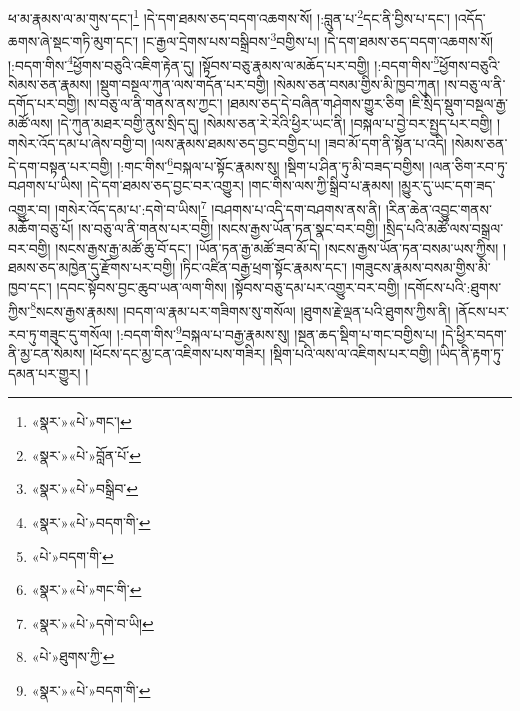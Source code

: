 ཕ་མ་རྣམས་ལ་མ་གུས་དང་།\footnote{«སྣར་»«པེ་»གང་།} །དེ་དག་ཐམས་ཅད་བདག་འཆགས་སོ། །:བླུན་པ་\footnote{«སྣར་»«པེ་»བློན་པོ་}དང་ནི་བྱིས་པ་དང་། །འདོད་ཆགས་ཞེ་སྡང་གཏི་མུག་དང་། །ང་རྒྱལ་དྲེགས་པས་བསྒྲིབས་\footnote{«སྣར་»«པེ་»བསྒྲིབ་}བགྱིས་པ། །དེ་དག་ཐམས་ཅད་བདག་འཆགས་སོ། །:བདག་གིས་\footnote{«སྣར་»«པེ་»བདག་གི་}ཕྱོགས་བཅུའི་འཇིག་རྟེན་དུ། །སྟོབས་བཅུ་རྣམས་ལ་མཆོད་པར་བགྱི། །:བདག་གིས་\footnote{«པེ་»བདག་གི་}ཕྱོགས་བཅུའི་སེམས་ཅན་རྣམས། །སྡུག་བསྔལ་ཀུན་ལས་གདོན་པར་བགྱི། །སེམས་ཅན་བསམ་གྱིས་མི་ཁྱབ་ཀུན། །ས་བཅུ་ལ་ནི་དགོད་པར་བགྱི། །ས་བཅུ་ལ་ནི་གནས་ནས་ཀྱང་། །ཐམས་ཅད་དེ་བཞིན་གཤེགས་གྱུར་ཅིག །ཇི་སྲིད་སྡུག་བསྔལ་རྒྱ་མཚོ་ལས། །དེ་ཀུན་མཐར་བགྱི་ནུས་སྲིད་དུ། །སེམས་ཅན་རེ་རེའི་ཕྱིར་ཡང་ནི། །བསྐལ་པ་བྱེ་བར་སྤྱད་པར་བགྱི། །གསེར་འོད་དམ་པ་ཞེས་བགྱི་བ། །ལས་རྣམས་ཐམས་ཅད་བྱང་བགྱིད་པ། །ཟབ་མོ་དག་ནི་སྟོན་པ་འདི། །སེམས་ཅན་དེ་དག་བསྟན་པར་བགྱི། །:གང་གིས་\footnote{«སྣར་»«པེ་»གང་གི་}བསྐལ་པ་སྟོང་རྣམས་སུ། །སྡིག་པ་ཤིན་ཏུ་མི་བཟད་བགྱིས། །ལན་ཅིག་རབ་ཏུ་བཤགས་པ་ཡིས། །དེ་དག་ཐམས་ཅད་བྱང་བར་འགྱུར། །གང་གིས་ལས་ཀྱི་སྒྲིབ་པ་རྣམས། །མྱུར་དུ་ཡང་དག་ཟད་འགྱུར་བ། །གསེར་འོད་དམ་པ་:དགེ་བ་ཡིས།\footnote{«སྣར་»«པེ་»དགེ་བ་ཡི།} །བཤགས་པ་འདི་དག་བཤགས་ནས་ནི། །རིན་ཆེན་འབྱུང་གནས་མཆོག་བཅུ་པོ། །ས་བཅུ་ལ་ནི་གནས་པར་བགྱི། །སངས་རྒྱས་ཡོན་ཏན་སྣང་བར་བགྱི། །སྲིད་པའི་མཚོ་ལས་བསྒྲལ་བར་བགྱི། །སངས་རྒྱས་རྒྱ་མཚོ་ཆུ་བོ་དང་། །ཡོན་ཏན་རྒྱ་མཚོ་ཟབ་མོ་དེ། །སངས་རྒྱས་ཡོན་ཏན་བསམ་ཡས་ཀྱིས། །ཐམས་ཅད་མཁྱེན་དུ་རྫོགས་པར་བགྱི། །ཏིང་འཛིན་བརྒྱ་ཕྲག་སྟོང་རྣམས་དང་། །གཟུངས་རྣམས་བསམ་གྱིས་མི་ཁྱབ་དང་། །དབང་སྟོབས་བྱང་ཆུབ་ཡན་ལག་གིས། །སྟོབས་བཅུ་དམ་པར་འགྱུར་བར་བགྱི། །དགོངས་པའི་:ཐུགས་ཀྱིས་\footnote{«པེ་»ཐུགས་ཀྱི་}སངས་རྒྱས་རྣམས། །བདག་ལ་རྣམ་པར་གཟིགས་སུ་གསོལ། །ཐུགས་རྗེ་ལྡན་པའི་ཐུགས་ཀྱིས་ནི། །ནོངས་པར་རབ་ཏུ་གཟུང་དུ་གསོལ། །:བདག་གིས་\footnote{«སྣར་»«པེ་»བདག་གི་}བསྐལ་པ་བརྒྱ་རྣམས་སུ། །སྔན་ཆད་སྡིག་པ་གང་བགྱིས་པ། །དེ་ཕྱིར་བདག་ནི་མྱ་ངན་སེམས། །ཕོངས་དང་མྱ་ངན་འཇིགས་པས་གཟིར། །སྡིག་པའི་ལས་ལ་འཇིགས་པར་བགྱི། །ཡིད་ནི་རྟག་ཏུ་དམན་པར་གྱུར། །
